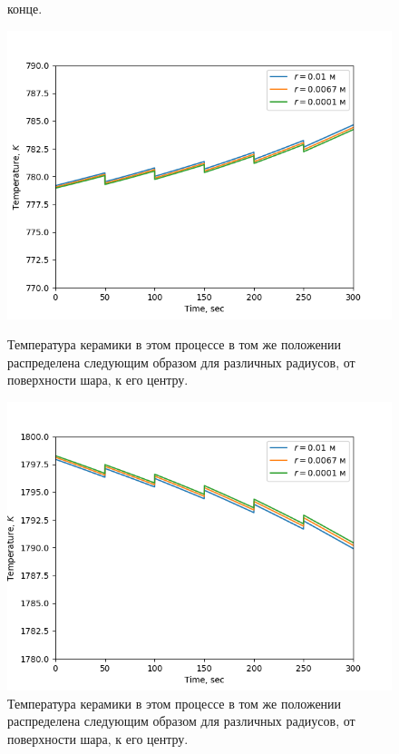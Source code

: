 \documentclass[a4paper,12pt]{article}
\begin{document}
\begin{figure}[ht]
\begin{minipage}[t]{0.23\textwidth}
{        конце.}
        \label{fig:img2}
    \end{minipage}
    \hfill
    \begin{minipage}[t]{0.23\textwidth}
        \centering
        \includegraphics[width=\textwidth]{img3}
        \caption {Температура керамики в этом процессе в том же
        положении распределена следующим образом для различных
        радиусов, от поверхности шара, к его центру.}
        \label{fig:img3}
    \end{minipage}
    \hfill
    \begin{minipage}[t]{0.23\textwidth}
        \centering
        \includegraphics[width=\textwidth]{img4}
        \caption {Температура керамики в этом процессе в том же
        положении распределена следующим образом для различных
        радиусов, от поверхности шара, к его центру.}
        \label{fig:img4}
    \end{minipage}
\end{figure}
\end{document}
